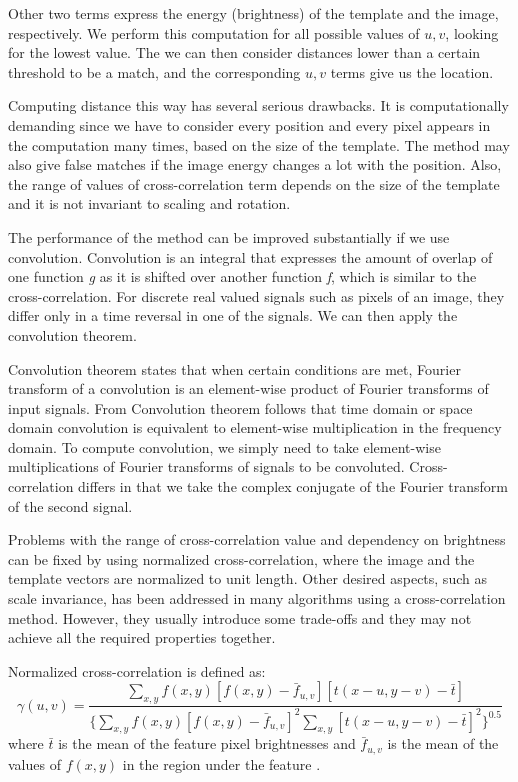 Other two terms express the energy (brightness) of the template and the image, respectively. We perform this computation for all possible values of $u,v$, looking for the lowest value. The we can then consider distances lower than a certain threshold to be a match, and the corresponding $u,v$ terms give us the location.

Computing distance this way has several serious drawbacks. It is computationally demanding since we have to consider every position and every pixel appears in the computation many times, based on the size of the template. The method may also give false matches if the image energy changes a lot with the position. Also, the range of values of cross-correlation term depends on the size of the template and it is not invariant to scaling and rotation.

The performance of the method can be improved substantially if we use convolution. Convolution is an integral that expresses the amount of overlap of one function \emph{g} as it is shifted over another function \emph{f}, which is similar to the cross-correlation. For discrete real valued signals such as pixels of an image, they differ only in a time reversal in one of the signals. We can then apply the convolution theorem.

Convolution theorem  states that when certain conditions are met, Fourier transform of a convolution is an element-wise product of Fourier transforms of input signals. From Convolution theorem follows that time domain or space domain convolution is equivalent to element-wise multiplication in the frequency domain. To compute convolution, we simply need to take element-wise multiplications of Fourier transforms of signals to be convoluted. Cross-correlation differs in that we take the complex conjugate of the Fourier transform of the second signal.

Problems with the range of cross-correlation value and dependency on brightness can be fixed by using normalized cross-correlation, where the image and the template vectors are normalized to unit length. Other desired aspects, such as scale invariance, has been addressed in many algorithms using a cross-correlation method. However, they usually introduce some trade-offs and they may not achieve all the required properties together.

Normalized cross-correlation is defined as:
\[
\gamma(u,v) = \frac{\sum_{x,y}f(x,y) [f(x,y)-\bar{f}_{u,v}][t(x-u,y-v)-\bar{t}]} {\{ \sum_{x,y}f(x,y) [f(x,y)-\bar{f}_{u,v}]^2 \sum_{x,y}[t(x-u,y-v)-\bar{t}]^2\}^{0.5}}
\]
where $\bar{t}$ is the mean of the feature pixel brightnesses and $\bar{f}_{u,v}$ is the mean of the values of $f(x,y)$ in the region under the feature \cite{crossCorrLewis}.

